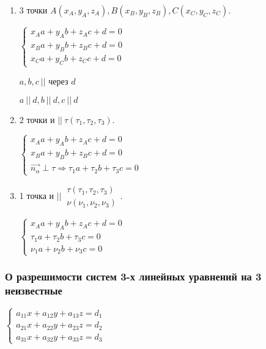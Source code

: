 \documentclass{article}
\begin{document}
    \begin{enumerate}
        \item 3 точки \(A(x_A, y_A, z_A), B(x_B, y_B, z_B), C(x_C, y_C, z_C)\).
        
        \(\begin{cases}
            x_Aa + y_Ab + z_Ac + d = 0\\
            x_Ba + y_Bb + z_Bc + d = 0\\
            x_Ca + y_Cb + z_Cc + d = 0
        \end{cases}\)

        \( a, b, c\ || \) через \(d\) 

        \( a\ ||\ d, b\ ||\ d, c\ ||\ d \)
        
        \item 2 точки и \(||\ \tau(\tau_1, \tau_2, \tau_3)\).
        
        \(\begin{cases}
            x_Aa + y_Ab + z_Ac + d = 0\\
            x_Ba + y_Bb + z_Bc + d = 0\\
            \vec{n_\alpha} \perp \tau \Rightarrow \tau_1a + \tau_2b + \tau_3c = 0
        \end{cases}\)

        \item 1 точка и \(||\ \begin{array}{l}\tau(\tau_1, \tau_2, \tau_3)\\ \nu(\nu_1, \nu_2, \nu_3)\end{array}\).
        
        \( 
            \begin{cases}
                x_Aa + y_Ab + z_Ac + d = 0\\
                \tau_1a + \tau_2b + \tau_3c = 0\\      
                \nu_1a + \nu_2b + \nu_3c = 0
            \end{cases}
        \)
    \end{enumerate}

    \subsubsection{О разрешимости систем 3-х линейных уравнений на 3 неизвестные}

    \( 
        \begin{cases} 
            a_{11}x + a_{12}y + a_{13}z = d_1\\
            a_{21}x + a_{22}y + a_{23}z = d_2\\
            a_{31}x + a_{32}y + a_{33}z = d_3
        \end{cases}
    \)
\end{document}
